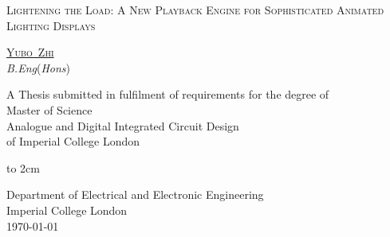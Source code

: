 \thispagestyle{empty}

\begin{center}
\null {}
\renewcommand{\baselinestretch}{2}

{\huge \textsc{Lightening the Load: A New Playback Engine for Sophisticated Animated Lighting Displays} \par}


\textsc{\large\href{yz4116@imperial.ac.uk}{Yubo~Zhi}} \\
\textit{B.Eng}(\textit{Hons})\\

A Thesis submitted in fulfilment of requirements for the degree of \\
Master of Science\\
Analogue and Digital Integrated Circuit Design\\
of Imperial College London

\centerline{\hbox to 2cm{}}




Department of Electrical and Electronic Engineering\\
Imperial College London\\
\today

\end{center}



